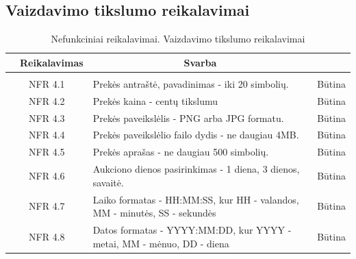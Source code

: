 \documentclass{VUMIFPSkursinis}
\begin{document}
	\subsection{Vaizdavimo tikslumo reikalavimai}
	\begin{table}[H]
		\caption{Nefunkciniai reikalavimai. Vaizdavimo tikslumo reikalavimai}
		\begin{tabular}{|p{1cm}|p{1cm}|p{}|p{}|}
			\hline 
			\rowcolor{gray!50}
			\multicolumn{2}{|c|}{{\bfseries Kodas}}&
			\multicolumn{1}{c|}{{\bfseries Reikalavimas}}&
			\multicolumn{1}{c|}{{\bfseries Svarba}}\\
			\hline
			\rowcolor{lightgray}
			\multicolumn{4}{|c|}{Vaizdavimo tikslumo reikalvimai}\\				
			\hline
			\multicolumn{2}{|c|}{NFR 4.1}&
			{Prekės antraštė, pavadinimas - iki 20 simbolių.}&		
			\multicolumn{1}{c|}{Būtina}\\
			\hline
			\multicolumn{2}{|c|}{NFR 4.2}&
			{Prekės kaina - centų tikslumu}&		
			\multicolumn{1}{c|}{Būtina}\\
			\hline
			\multicolumn{2}{|c|}{NFR 4.3}&
			{Prekės paveikslėlis - PNG arba JPG formatu.}&		
			\multicolumn{1}{c|}{Būtina}\\
			\hline
			\multicolumn{2}{|c|}{NFR 4.4}&
			{Prekės paveikslėlio failo dydis - ne daugiau 4MB.}&		
			\multicolumn{1}{c|}{Būtina}\\
			\hline
			\multicolumn{2}{|c|}{NFR 4.5}&
			{Prekės aprašas - ne daugiau 500 simbolių.}&		
			\multicolumn{1}{c|}{Būtina}\\
			\hline
			\multicolumn{2}{|c|}{NFR 4.6}&
			{Aukciono dienos pasirinkimas - 1 diena, 3 dienos, savaitė.}&		
			\multicolumn{1}{c|}{Būtina}\\
			\hline
			\multicolumn{2}{|c|}{NFR 4.7}&
			{Laiko formatas - HH:MM:SS, kur HH - valandos, MM - minutės, SS - sekundės}&	
			\multicolumn{1}{c|}{Būtina}\\
			\hline
			\multicolumn{2}{|c|}{NFR 4.8}&
			{Datos formatas - YYYY:MM:DD, kur YYYY - metai, MM - mėnuo, DD - diena}&	
			\multicolumn{1}{c|}{Būtina}\\
			\hline
		\end{tabular}		
	\end{table}
	
\end{document}
